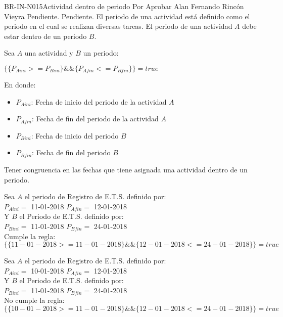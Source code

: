 \begin{BusinessRule}{BR-IN-N015}{Actividad dentro de periodo}
	{\bcAutorization}  %
	{\btEnabler}    %
	{\blControlling}    %
	\BRItem[Estado] Por Aprobar
	 Alan Fernando Rincón Vieyra
	 Pendiente.
	 Pendiente.
	\BRItem[Descripción]  El periodo de una actividad está definido como el periodo en el cual se realizan diversas tareas. El periodo de una actividad $A$ debe estar dentro de un periodo $B$.
	
	\BRItem[Sentencia] Sea $A$ una actividad y $B$ un periodo:
	\begin{center}
		$ \{ \{P_{Aini} >= P_{Bini} \} \&\& \{P_{Afin} <= P_{Bfin}\} 
		\} = true$ 
	\end{center}
	
	En donde:
	\begin{itemize}
		\item $P_{Aini}$: Fecha de inicio del periodo de la actividad $A$
		\item $P_{Afin}$: Fecha de fin del periodo de la actividad $A$
		\item $P_{Bini}$: Fecha de inicio del periodo $B$
		\item $P_{Bfin}$: Fecha de fin del periodo $B$
		
	\end{itemize}
	
	\BRItem[Motivación] Tener congruencia en las fechas que tiene asignada una actividad dentro de un periodo.
	
	Sea $A$ el periodo de Registro de E.T.S. definido por: \\
	$P_{Aini}=$ 11-01-2018
	$P_{Afin}=$ 12-01-2018 \\
	Y $B$ el Periodo de E.T.S. definido por:\\
	$P_{Bini}=$ 11-01-2018
	$P_{Bfin}=$ 24-01-2018 \\
	
	Cumple la regla:
	$ \{ \{11-01-2018 >= 11-01-2018 \} \&\& \{12-01-2018 <= 24-01-2018\} 
	\} = true$ 
	
	
	Sea $A$ el periodo de Registro de E.T.S. definido por: \\
	$P_{Aini}=$ 10-01-2018
	$P_{Afin}=$ 12-01-2018 \\
	Y $B$ el Periodo de E.T.S. definido por:\\
	$P_{Bini}=$ 11-01-2018
	$P_{Bfin}=$ 24-01-2018 \\
	
	No cumple la regla:
	$ \{ \{10-01-2018 >= 11-01-2018 \} \&\& \{12-01-2018 <= 24-01-2018\} 
	\} = true$
\end{BusinessRule}

